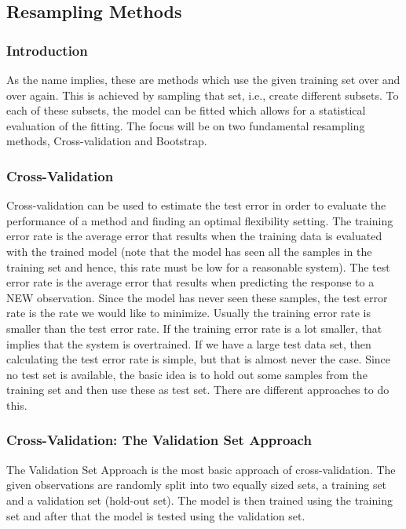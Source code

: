 {\subsection{Resampling Methods}
\subsubsection{Introduction}
As the name implies, these are methods which use the given training set over and over again.
This is achieved by sampling that set, i.e., create different subsets.
To each of these subsets, the model can be fitted which allows for a statistical evaluation of the fitting.
The focus will be on two fundamental resampling methods, Cross-validation and Bootstrap.

\subsubsection{Cross-Validation}
Cross-validation can be used to estimate the test error in order to evaluate the performance of a method and finding an optimal flexibility  setting.
The training error rate is the average error that results when the training data is evaluated with the trained model (note that the model has seen all the samples in the training set and hence, this rate must be low for a reasonable  system).
The test error rate is the average error that results when predicting the response to a NEW observation.
Since the model has never seen these samples, the test error rate is the rate we would like to minimize.
Usually the training error rate is smaller than the test  error rate.
If the training error rate is a lot smaller, that implies that the system is overtrained.
If we have a large test data set, then calculating the test error rate is simple, but that is almost never the case.
Since no test set is available, the basic idea is to hold out some samples from the training set and then use these as test set.
There are different approaches to do this.

\subsubsection{Cross-Validation: The Validation Set Approach}
The Validation Set Approach is the most basic approach of cross-validation.
The given observations are randomly split into two equally sized sets, a training set and a validation set (hold-out set).
The model is then trained using the training set and after that the model is tested using the validation set.

}
